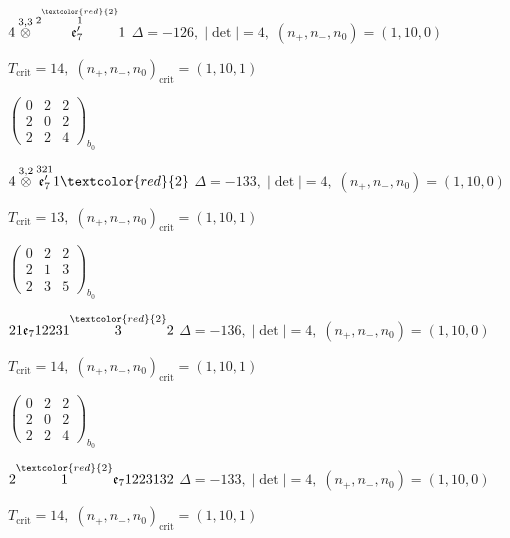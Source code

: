 \documentclass[10pt]{article}
\begin{document}
\smallskip

$4\overset{3,3}{\otimes}\overset{2\overset{\textcolor{red}{2}}{1}}{\mathfrak{e}_7'}1$ \quad $\Delta=-126,\; |\det|=4,\; (n_+,n_-,n_0)=(1,10,0)$

\hspace{1em}$T_{\text{crit}}=14,\; (n_+,n_-,n_0)_{\text{crit}}=(1,10,1)$

\hspace{2em}$\left(\begin{smallmatrix}0 & 2 & 2 \\ 2 & 0 & 2 \\ 2 & 2 & 4\end{smallmatrix}\right)_{\!b_0}$

\smallskip

$4\overset{3,2}{\otimes}\overset{321}{\mathfrak{e}_7'}1\textcolor{red}{2}$ \quad $\Delta=-133,\; |\det|=4,\; (n_+,n_-,n_0)=(1,10,0)$

\hspace{1em}$T_{\text{crit}}=13,\; (n_+,n_-,n_0)_{\text{crit}}=(1,10,1)$

\hspace{2em}$\left(\begin{smallmatrix}0 & 2 & 2 \\ 2 & 1 & 3 \\ 2 & 3 & 5\end{smallmatrix}\right)_{\!b_0}$

\smallskip

$21\mathfrak{e}_712231\overset{\textcolor{red}{2}}{3}2$ \quad $\Delta=-136,\; |\det|=4,\; (n_+,n_-,n_0)=(1,10,0)$

\hspace{1em}$T_{\text{crit}}=14,\; (n_+,n_-,n_0)_{\text{crit}}=(1,10,1)$

\hspace{2em}$\left(\begin{smallmatrix}0 & 2 & 2 \\ 2 & 0 & 2 \\ 2 & 2 & 4\end{smallmatrix}\right)_{\!b_0}$

$2\overset{\textcolor{red}{2}}{1}\mathfrak{e}_71223132$ \quad $\Delta=-133,\; |\det|=4,\; (n_+,n_-,n_0)=(1,10,0)$

\hspace{1em}$T_{\text{crit}}=14,\; (n_+,n_-,n_0)_{\text{crit}}=(1,10,1)$
\end{document}
